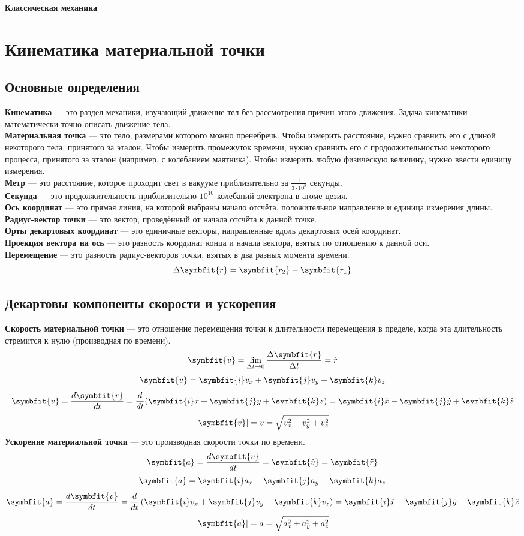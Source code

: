 \documentclass[fleqn,a4paper,12pt,titlepage,finall]{article}
\newcommand\vv[1]{\symbfit{#1}}
\begin{document}
{\huge \bf \centering Классическая механика \par}
\tableofcontents
\section{Кинематика материальной точки}
\subsection{Основные определения}
{\bf Кинематика} --- это раздел механики, изучающий движение тел без рассмотрения
причин этого движения. Задача кинематики --- математически точно описать
движение тела. \\
{\bf Материальная точка} --- это тело, размерами которого можно пренебречь.
Чтобы измерить расстояние, нужно сравнить его с длиной некоторого тела,
принятого за эталон. Чтобы измерить промежуток времени, нужно сравнить его с
продолжительностью некоторого процесса, принятого за эталон (например, с
колебанием маятника). Чтобы измерить любую физическую величину, нужно ввести
единицу измерения. \\
{\bf Метр} --- это расстояние, которое проходит свет в вакууме приблизительно за
$\frac{1}{3\cdot 10^8}$ секунды. \\
{\bf Секунда} --- это продолжительность приблизительно $10^{10}$ колебаний
электрона в атоме цезия.  \\
{\bf Ось координат} --- это прямая линия, на которой выбраны начало отсчёта,
положительное направление и единица измерения длины. \\
{\bf Радиус-вектор точки} --- это вектор, проведённый от начала отсчёта к данной
точке. \\
{\bf Орты декартовых координат} --- это единичные векторы, направленные вдоль
декартовых осей координат. \\
{\bf Проекция вектора на ось} --- это разность координат конца и начала вектора,
взятых по отношению к данной оси. \\
{\bf Перемещение} --- это разность радиус-векторов точки, взятых в два разных
момента времени.
\[\Delta \vv{r} = \vv{r_2} - \vv{r_1}\]
\subsection{Декартовы компоненты скорости и ускорения}
{\bf Скорость материальной точки} --- это отношение перемещения точки к длительности
перемещения в пределе, когда эта длительность стремится к нулю (производная по
времени).
\[\vv{v} = \lim_{\Delta t \to 0} \frac{\Delta \vv{r}}{\Delta t}	= \dot{r}\]
\[\vv{v} = \vv{i}v_x + \vv{j}v_y + \vv{k}v_z\]
\[\vv{v} = \frac{d\vv{r}}{dt} = \frac{d}{dt}(\vv{i}x+\vv{j}y+\vv{k}z) =
\vv{i}\dot{x} + \vv{j}\dot{y} + \vv{k}\dot{z}\]
\[|\vv{v}| = v = \sqrt{v_x^2 + v_y^2 + v_z^2}\]
{\bf Ускорение материальной точки} --- это производная скорости точки по времени.
\[\vv{a} = \frac{d\vv{v}}{dt} = \vv{\dot{v}} = \vv{\ddot{r}}\]
\[\vv{a} = \vv{i}a_x + \vv{j}a_y + \vv{k}a_z\]
\[\vv{a} = \frac{d\vv{v}}{dt} =
\frac{d}{dt}\left(\vv{i}v_x+\vv{j}v_y+\vv{k}v_z\right) =
\vv{i}\ddot{x} + \vv{j}\ddot{y} + \vv{k}\ddot{z}\]
\[|\vv{a}| = a = \sqrt{a_x^2 + a_y^2 + a_z^2}\]
\end{document}
